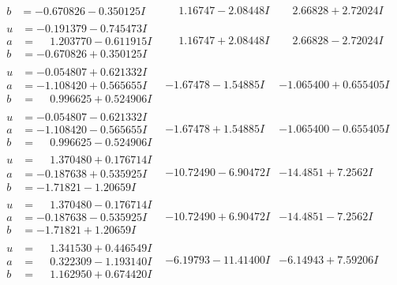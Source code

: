 \documentclass[1p]{elsarticle_modified}
\theoremstyle{definition}
\begin{document}
$$\begin{array}{c|c|c}
\begin{aligned}
b &= -0.670826 - 0.350125 I\end{aligned}
 & \phantom{-}1.16747 - 2.08448 I & \phantom{-}2.66828 + 2.72024 I \\ \hline\begin{aligned}
u &= -0.191379 - 0.745473 I \\
a &= \phantom{-}1.203770 - 0.611915 I \\
b &= -0.670826 + 0.350125 I\end{aligned}
 & \phantom{-}1.16747 + 2.08448 I & \phantom{-}2.66828 - 2.72024 I \\ \hline\begin{aligned}
u &= -0.054807 + 0.621332 I \\
a &= -1.108420 + 0.565655 I \\
b &= \phantom{-}0.996625 + 0.524906 I\end{aligned}
 & -1.67478 - 1.54885 I & -1.065400 + 0.655405 I \\ \hline\begin{aligned}
u &= -0.054807 - 0.621332 I \\
a &= -1.108420 - 0.565655 I \\
b &= \phantom{-}0.996625 - 0.524906 I\end{aligned}
 & -1.67478 + 1.54885 I & -1.065400 - 0.655405 I \\ \hline\begin{aligned}
u &= \phantom{-}1.370480 + 0.176714 I \\
a &= -0.187638 + 0.535925 I \\
b &= -1.71821 - 1.20659 I\end{aligned}
 & -10.72490 - 6.90472 I & -14.4851 + 7.2562 I \\ \hline\begin{aligned}
u &= \phantom{-}1.370480 - 0.176714 I \\
a &= -0.187638 - 0.535925 I \\
b &= -1.71821 + 1.20659 I\end{aligned}
 & -10.72490 + 6.90472 I & -14.4851 - 7.2562 I \\ \hline\begin{aligned}
u &= \phantom{-}1.341530 + 0.446549 I \\
a &= \phantom{-}0.322309 - 1.193140 I \\
b &= \phantom{-}1.162950 + 0.674420 I\end{aligned}
 & -6.19793 - 11.41400 I & -6.14943 + 7.59206 I \\ \hline\begin{aligned}

\end{aligned}
\end{array}$$
\end{document}
